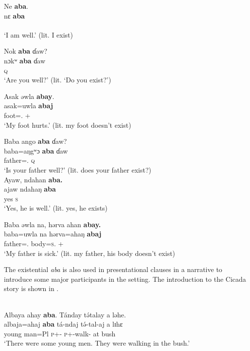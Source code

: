 \medskip
\ex
Ne \textbf{aba}. \\
\gll nɛ \textbf{aba} \\
     {\oneS} \EXT \\
\glt ‘I am well.’ (lit. I exist)\\
\z\z

\ea \label{ex:3:90}
Nok \textbf{aba}  ɗaw?\\
\gll  nɔkʷ  \textbf{aba}    ɗaw\\
      {\twoS}    {\EXT}    {\textsc{q}}\\
\glt  ‘Are you well?’ (lit. ‘Do you exist?’)
\z

\ea \label{ex:3:91}
Asak  əwla  \textbf{abay}.\\
\gll  asak=uwla    \textbf{abaj}\\
      foot={\oneS}.{\POSS}  {\EXT}+{\NEG}\\
\glt  ‘My foot hurts.’ (lit. my foot doesn’t exist)
\z

\ea \label{ex:3:92}
\ea Baba  ango \textbf{aba} ɗaw?  \\
\gll baba=aŋgʷɔ     \textbf{aba}   ɗaw   \\
      father={\twoS}.{\POSS}  {\EXT}  {\textsc{q}}   \\
\glt ‘Is your father well?’  (lit. does your father exist?)  \\

\medskip
 \ex
Ayaw,  ndahan \textbf{aba.}\\
 \gll ajaw   ndahaŋ  \textbf{aba}\\
      yes  \textsc{s}  {\EXT}\\ 
 \glt ‘Yes, he is well.’ (lit. yes, he exists)\\
\z\z

\ea \label{ex:3:93} 
Baba  əwla  na,  hərva  ahan \textbf{abay.}\\
\gll baba=uwla      na  hərva=ahaŋ      \textbf{abaj}\\
      father={\oneS}.{\POSS}  {\PSP}  body=\textsc{s}.{\POSS}    {\EXT}+{\NEG}\\
\glt ‘My father is sick.’ (lit. my father, his body doesn’t exist)
\z

The existential \textit{aba} is also used in presentational clauses in a narrative to introduce some major participants in the setting. The introduction to the Cicada story is shown in . 

\ea \label{ex:3:94}\\
Albaya  ahay  \textbf{aba}.  Tánday  t\'{ə}talay  a  ləhe.\\
\gll  albaja=ahaj  \textbf{aba}  tá-ndaj    t\'{ə}-tal-aj    a  lɪhɛ\\
      {young man}=Pl  {\EXT}  \textsc{p}+{\IFV}-{\PRG}     \textsc{p}+{\IFV}-walk-{\CL}  at    bush\\
\glt  ‘There were some young men. They were walking in the bush.’
\z

